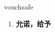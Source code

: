 
\begin{frame}
{\huge vouchsafe}
\begin{center}
\begin{enumerate}\Large
  \item \textbf{允诺，给予}
\end{enumerate}
\end{center}
\end{frame}
